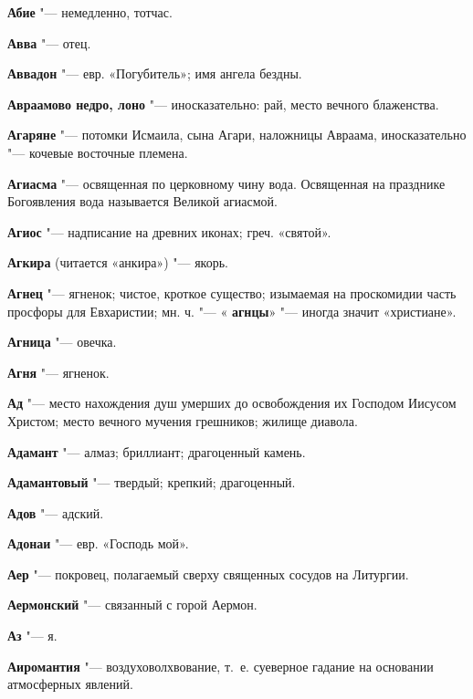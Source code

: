 \renewcommand{\ornament}{uzor_begin_4}
 
\begin{mymulticols}\footnotesize


\noindent\textbf{Абие} "--- немедленно, тотчас. 

\noindent\textbf{Авва} "--- отец. 

\noindent\textbf{Аввадон} "--- евр. «Погубитель»; имя ангела бездны. 

\noindent\textbf{Авраамово недро, лоно} "--- иносказательно: рай, место вечного блаженства. 

\noindent\textbf{Агаряне} "--- потомки Исмаила, сына Агари, наложницы Авраама, иносказательно "--- кочевые восточные племена. 

\noindent\textbf{Агиасма} "--- освященная по церковному чину вода. Освященная на празднике Богоявления вода называется Великой агиасмой. 

\noindent\textbf{Агиос} "--- надписание на древних иконах; греч. «святой». 

\noindent\textbf{Агкира} (читается «анкира») "--- якорь. 

\noindent\textbf{Агнец} "--- ягненок; чистое, кроткое существо; изымаемая на проскомидии часть просфоры для Евхаристии; мн. ч. "--- « \noindent\textbf{агнцы}» "--- иногда значит «христиане». 

\noindent\textbf{Агница} "--- овечка. 

\noindent\textbf{Агня} "--- ягненок. 

\noindent\textbf{Ад} "--- место нахождения душ умерших до освобождения их Господом Иисусом Христом; место вечного мучения грешников; жилище диавола. 

\noindent\textbf{Адамант} "--- алмаз; бриллиант; драгоценный камень. 

\noindent\textbf{Адамантовый} "--- твердый; крепкий; драгоценный. 

\noindent\textbf{Адов} "--- адский. 

\noindent\textbf{Адонаи} "--- евр. «Господь мой». 

\noindent\textbf{Аер} "--- покровец, полагаемый сверху священных сосудов на Литургии. 

\noindent\textbf{Аермонский} "--- связанный с горой Аермон. 

\noindent\textbf{Аз} "--- я. 

\noindent\textbf{Аиромантия} "--- воздуховолхвование, т.~е. суеверное гадание на основании атмосферных явлений. 


\end{mymulticols}
